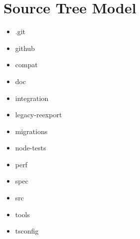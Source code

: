 \section{Source Tree Model}


\begin{itemize}
  \item .git
  \item github
  \item compat
  \item doc
  \item integration
  \item legacy-reexport
  \item migrations
  \item node-tests
  \item perf
  \item spec
  \item src
  \item tools
  \item tsconfig
\end{itemize}




